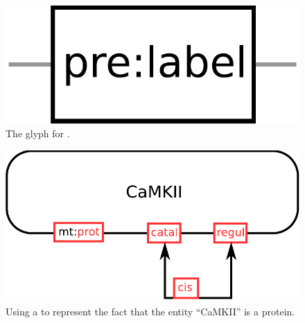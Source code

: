 \begin{figure}[H]
  \centering
  \includegraphics[scale = 0.3]{images/unitInformation}
  \caption{The \ER glyph for .}
  \label{fig:unitInformation}
\end{figure}

\begin{figure}[H]
  \centering
  \includegraphics[scale = 0.5]{examples/ex-unitInformation}
  \caption{Using a  to represent the fact that the entity ``CaMKII'' is a protein.}
  \label{fig:ex-unitInformation}
\end{figure}

\normalcolor
